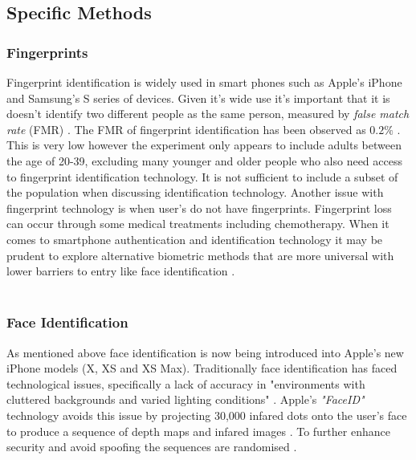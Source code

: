 \documentclass[12pt]{article}
\begin{document}
	\subsection{Specific Methods}
	\label{subsect:specific_methods}
	\subsubsection{Fingerprints}
	\label{subsubsect:fingerprints}
	Fingerprint identification is widely used in smart phones such as Apple's iPhone and Samsung's S series of devices. Given it's wide use it's important that it is doesn't identify two different people as the same person, measured by \emph{false match rate} (FMR) \citep{delac2004survey}. The FMR of fingerprint identification has been observed as $0.2\%$ \citep{delac2004survey}. This is very low however the experiment only appears to include adults between the age of 20-39, excluding many younger and older people who also need access to fingerprint identification technology. It is not sufficient to include a subset of the population when discussing identification technology. Another issue with fingerprint technology is when user's do not have fingerprints. Fingerprint loss can occur through some medical treatments including chemotherapy. When it comes to smartphone authentication and identification technology it may be prudent to explore alternative biometric methods that are more universal with lower barriers to entry like face identification \citep{prabhakar2003biometric}.
	\\
	\\
	\subsubsection{Face Identification}
	\label{subsubsect:face_identification}
	As mentioned above face identification is now being introduced into Apple's new iPhone models (X, XS and XS Max). Traditionally face identification has faced technological issues, specifically a lack of accuracy in "environments with cluttered backgrounds and varied lighting conditions" \citep{prabhakar2003biometric}. Apple's \emph{"FaceID"} technology avoids this issue by projecting 30,000 infared dots onto the user's face to produce a sequence of depth maps and infared images \citep{apple_faceid_2017}. To further enhance security and avoid spoofing the sequences are randomised \citep{apple_faceid_2017}.
	\\
	\\
\end{document}
